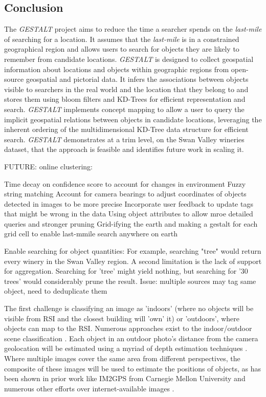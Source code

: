 \subsection{Conclusion}
The \textit{GESTALT} project aims to reduce the time a searcher spends on the \textit{last-mile} of searching for a location. 
It assumes that the \textit{last-mile} is in a constrained geographical region and allows users to search for objects they are likely to remember from candidate locations. 
\textit{GESTALT} is designed to collect geospatial information about locations and objects within geographic regions from open-source geospatial and pictorial data. 
It infers the associations between objects visible to searchers in the real world and the location that they belong to and stores them using bloom filters and KD-Trees for efficient representation and search.
\textit{GESTALT} implements concept mapping to allow a user to query the implicit geospatial relations between objects in candidate locations, leveraging the inherent ordering of the multidimensional KD-Tree data structure for efficient search. 
\textit{GESTALT} demonstrates at a trim level, on the Swan Valley wineries dataset, that the approach is feasible and identifies future work in scaling it.


FUTURE: online clustering: \cite{Montiel2021}

Time decay on confidence score to account for changes in environment
Fuzzy string matching
Account for camera bearings to adjust coordinates of objects detected in images to be more precise
Incorporate user feedback to update tags that might be wrong in the data
Using object attributes to allow mroe detailed queries and stronger pruning
Grid-ifying the earth and making a gestalt for each grid cell to enable last-mmile search anywhere on earth

Enable searching for object quantities: For example, searching "tree" would return every winery in the Swan Valley region. A second limitation is the lack of support for aggregation. Searching for 'tree' might yield nothing, but searching for '30 trees' would considerably prune the result. Issue: multiple sources may tag same object, need to deduplicate them



The first challenge is classifying an image as 'indoors' (where no objects will be visible from RSI and the closest building will 'own' it) or 'outdoors', where objects can map to the RSI. Numerous approaches exist to the indoor/outdoor scene classification \cite{Tong2017}. 
Each object in an outdoor photo's distance from the camera geolocation will be estimated using a myriad of depth estimation techniques \cite{Ming2021,Liu2020}. 
Where multiple images cover the same area from different perspectives, the composite of these images will be used to estimate the positions of objects, as has been shown in prior work like IM2GPS from Carnegie Mellon University \cite{Hays2008} and numerous other efforts over internet-available images \cite{Snavely2011}. 

